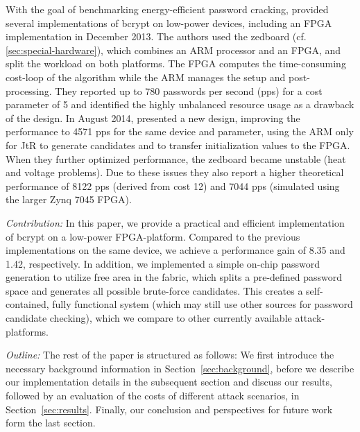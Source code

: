 With the goal of benchmarking energy-efficient password cracking,
\cite{PWDCON_Bcrypt} provided several implementations of bcrypt on low-power
devices, including an FPGA implementation in December 2013. The authors used the
zedboard (cf. \ref{sec:special-hardware}), which combines an ARM processor and
an FPGA, and split the workload on both platforms. The FPGA computes the
time-consuming cost-loop of the algorithm while the ARM manages the setup and
post-processing. They reported up to 780 passwords per second (pps) for a cost
parameter of 5 and identified the highly unbalanced resource usage as a drawback
of the design.
%
In August 2014, \cite{WOOT/Malvoni14} presented
a new design, improving the performance to 4571 pps
for the same device and parameter, using the ARM only for JtR to generate
candidates and to transfer initialization values to the FPGA. When they further
optimized performance, the zedboard became unstable (heat and voltage problems).
Due to these issues they also report a higher theoretical performance of 8122
pps (derived from cost 12) and 7044 pps (simulated using the larger Zynq 7045
FPGA).

\emph{Contribution:} In this paper, we provide a practical and efficient
implementation of bcrypt on a low-power FPGA-platform. Compared to the previous
implementations on the same device, we achieve a performance gain of 8.35 and
1.42, respectively.
In addition, we implemented a simple on-chip password generation to
utilize free area in the fabric, which splits a pre-defined password space and
generates all possible brute-force candidates. This creates a self-contained,
fully functional system (which may still use other sources for password
candidate checking), which we compare to other currently available
attack-platforms.

\emph{Outline:} The rest of the paper is structured as follows: We first
introduce the necessary background information in Section~\ref{sec:background},
before we describe our implementation details in the subsequent section and
discuss our results, followed by an evaluation of the costs of different attack
scenarios, in Section~\ref{sec:results}. Finally, our conclusion and
perspectives for future work form the last section.
